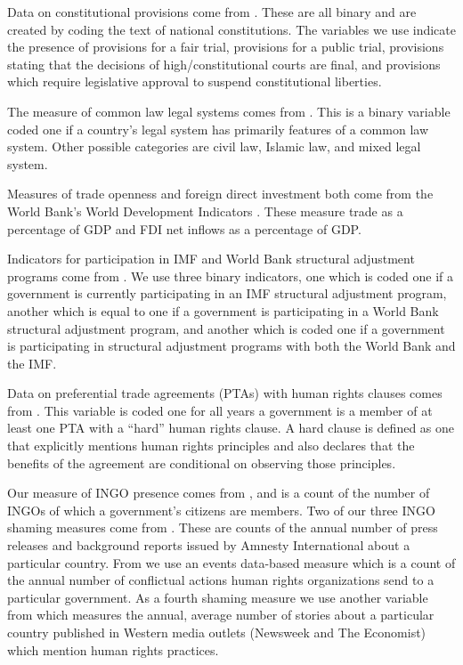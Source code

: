 \documentclass[12pt]{article}
\begin{document}
Data on constitutional provisions come from \citet{KeithTatePoe2009}. These are all binary and are created by 
coding the text of national constitutions. The variables we use indicate the presence of provisions for a fair trial, provisions for a public trial, provisions stating that the decisions of high/constitutional courts are final, and provisions which require legislative approval to suspend constitutional liberties. 

The measure of common law legal systems comes from \citet{powell2007international}. This is a binary variable coded one if a country's legal system has primarily features of a common law system. Other possible categories are civil law, Islamic law, and mixed legal system.

Measures of trade openness and foreign direct investment both come from the World Bank's World Development Indicators \citep{WorldBank2012}. These measure trade as a percentage of GDP and FDI net inflows as a percentage of GDP. 

Indicators for participation in IMF and World Bank structural adjustment programs come from \citet{AbouharbCingranelli2007}. We use three binary indicators, one which is coded one if a government is currently participating in an IMF structural adjustment program, another which is equal to one if a government is participating in a World Bank structural adjustment program, and another which is coded one if a government is participating in structural adjustment programs with both the World Bank and the IMF.

Data on preferential trade agreements (PTAs) with human rights clauses comes from \citet{SpilkerBohmelt2012}. This variable is coded one for all years a government is a member of at least one PTA with a ``hard'' human rights clause. A hard clause is defined as one that explicitly mentions human rights principles and also declares that the benefits of the agreement are conditional on observing those principles. 

Our measure of INGO presence comes from \citet{HafnerBurtonTsutsui2005}, and is a count of the number of INGOs of which a government's citizens are members. Two of our three INGO shaming measures come from \citet{RonRamosRodgers2005}. These are counts of the annual number of press releases and background reports issued by Amnesty International about a particular country. From \citet{MurdieDavis2012} we use an events data-based measure which is a count of the annual number of conflictual actions human rights organizations send to a particular government. As a fourth shaming measure we use another variable from \citet{RonRamosRodgers2005} which measures the annual, average number of stories about a particular country published in Western media outlets (Newsweek and The Economist) which mention human rights practices. 
\end{document}
